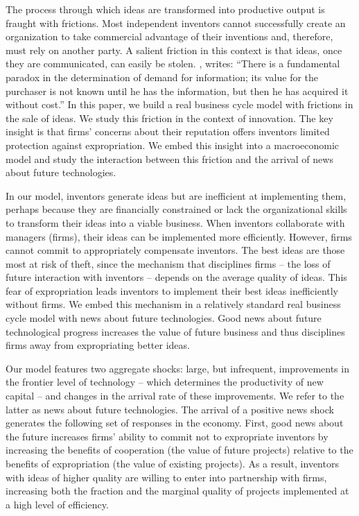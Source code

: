 \documentclass[12pt]{article}
\renewcommand{\cite}{\citet}
\begin{document}
The process through which ideas are transformed into productive output is fraught with frictions. Most independent inventors cannot successfully create an organization to take commercial advantage of their inventions and, therefore, must rely on another party. A salient friction  in this context is that ideas, once they are communicated, can easily be stolen.
\cite{Arrow1962}, writes: ``There is a fundamental paradox in the determination of demand for information; its value for the purchaser is not known until he has the information, but then he has acquired it without cost.''  In this paper, we build a real business cycle model with frictions in the sale of ideas. We study this friction in the context of innovation. The key insight is that firms' concerns about their reputation offers inventors limited protection against expropriation. We embed this insight into a macroeconomic model and study the interaction between this friction and the arrival of news about future technologies.

In our model, inventors generate ideas but are inefficient at implementing them, perhaps because they are financially constrained or lack the organizational skills to transform their ideas into a viable business. 
When inventors collaborate with managers (firms), their ideas can be implemented more efficiently. However, firms cannot commit to appropriately compensate inventors. The best ideas are those most at risk of theft, since the mechanism that disciplines firms -- the loss of future interaction with inventors -- depends on the average quality of ideas. This fear of expropriation leads inventors to  implement their best ideas inefficiently without firms. We embed this mechanism in a relatively standard real business cycle model with news about future technologies. Good news about future technological progress increases the value of future business and thus disciplines firms away from  expropriating better ideas. 

Our model features two aggregate shocks: large, but infrequent, improvements in the frontier level of technology -- which determines the productivity of new capital -- and changes in the arrival rate of these improvements. We refer to the latter as news about future technologies. The arrival of a positive news shock generates the following set of responses in the economy. First, good news about the future increases firms' ability to commit not to expropriate inventors by increasing the benefits of cooperation (the value of future projects) relative to the benefits of expropriation (the value of existing projects). As a result, inventors with ideas of higher quality are willing to enter into partnership with firms, increasing both the fraction and the marginal quality of projects implemented at a high level of efficiency.
\end{document}
